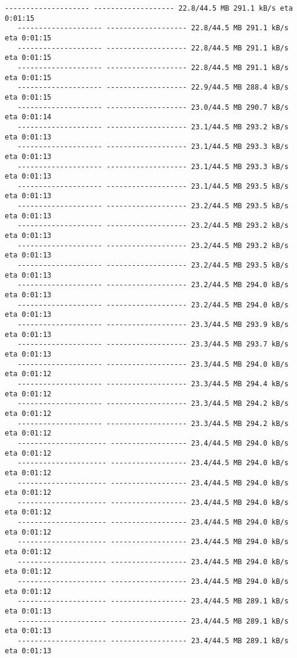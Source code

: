 \documentclass[11pt]{article}
\begin{document}
\begin{Verbatim}[commandchars=\\\{\}]
   -------------------- ------------------- 22.8/44.5 MB 291.1 kB/s eta 0:01:15
   -------------------- ------------------- 22.8/44.5 MB 291.1 kB/s eta 0:01:15
   -------------------- ------------------- 22.8/44.5 MB 291.1 kB/s eta 0:01:15
   -------------------- ------------------- 22.8/44.5 MB 291.1 kB/s eta 0:01:15
   -------------------- ------------------- 22.9/44.5 MB 288.4 kB/s eta 0:01:15
   -------------------- ------------------- 23.0/44.5 MB 290.7 kB/s eta 0:01:14
   -------------------- ------------------- 23.1/44.5 MB 293.2 kB/s eta 0:01:13
   -------------------- ------------------- 23.1/44.5 MB 293.3 kB/s eta 0:01:13
   -------------------- ------------------- 23.1/44.5 MB 293.3 kB/s eta 0:01:13
   -------------------- ------------------- 23.1/44.5 MB 293.5 kB/s eta 0:01:13
   -------------------- ------------------- 23.2/44.5 MB 293.5 kB/s eta 0:01:13
   -------------------- ------------------- 23.2/44.5 MB 293.2 kB/s eta 0:01:13
   -------------------- ------------------- 23.2/44.5 MB 293.2 kB/s eta 0:01:13
   -------------------- ------------------- 23.2/44.5 MB 293.5 kB/s eta 0:01:13
   -------------------- ------------------- 23.2/44.5 MB 294.0 kB/s eta 0:01:13
   -------------------- ------------------- 23.2/44.5 MB 294.0 kB/s eta 0:01:13
   -------------------- ------------------- 23.3/44.5 MB 293.9 kB/s eta 0:01:13
   -------------------- ------------------- 23.3/44.5 MB 293.7 kB/s eta 0:01:13
   -------------------- ------------------- 23.3/44.5 MB 294.0 kB/s eta 0:01:12
   -------------------- ------------------- 23.3/44.5 MB 294.4 kB/s eta 0:01:12
   -------------------- ------------------- 23.3/44.5 MB 294.2 kB/s eta 0:01:12
   -------------------- ------------------- 23.3/44.5 MB 294.2 kB/s eta 0:01:12
   --------------------- ------------------ 23.4/44.5 MB 294.0 kB/s eta 0:01:12
   --------------------- ------------------ 23.4/44.5 MB 294.0 kB/s eta 0:01:12
   --------------------- ------------------ 23.4/44.5 MB 294.0 kB/s eta 0:01:12
   --------------------- ------------------ 23.4/44.5 MB 294.0 kB/s eta 0:01:12
   --------------------- ------------------ 23.4/44.5 MB 294.0 kB/s eta 0:01:12
   --------------------- ------------------ 23.4/44.5 MB 294.0 kB/s eta 0:01:12
   --------------------- ------------------ 23.4/44.5 MB 294.0 kB/s eta 0:01:12
   --------------------- ------------------ 23.4/44.5 MB 294.0 kB/s eta 0:01:12
   --------------------- ------------------ 23.4/44.5 MB 289.1 kB/s eta 0:01:13
   --------------------- ------------------ 23.4/44.5 MB 289.1 kB/s eta 0:01:13
   --------------------- ------------------ 23.4/44.5 MB 289.1 kB/s eta 0:01:13

\end{Verbatim}
\end{document}
